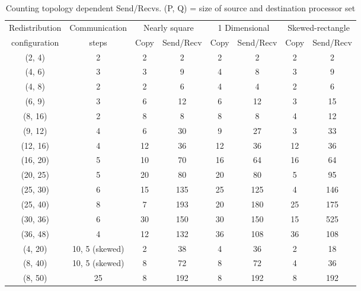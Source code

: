 \documentclass[letterpaper]{llncs}
\begin{document}
\begin{table}[ht]
\begin{center}
\caption{ Counting topology dependent Send/Recvs. (P, Q) = size of source and destination processor set}
\label{tab:topologycount}
\begin{tabular}{|c|c|c|c|c|c|c|c|}
\hline
Redistribution&Communication&\multicolumn{2}{|c|}{Nearly square}&\multicolumn{2}{|c|}{1 Dimensional}&\multicolumn{2}{|c|}{Skewed-rectangle}\\
configuration&steps&Copy&Send/Recv&Copy&Send/Recv&Copy&Send/Recv\\
\hline
(2, 4)&2&2&2&2&2&2&2\\
\hline
(4, 6)&3&3&9&4&8&3&9\\
\hline
(4, 8)&2&2&6&4&4&2&6\\
\hline
(6, 9)&3&6&12&6&12&3&15\\
\hline
(8, 16)&2&8&8&8&8&4&12\\
\hline
(9, 12)&4&6&30&9&27&3&33\\
\hline
(12, 16)&4&12&36&12&36&12&36\\
\hline
(16, 20)&5&10&70&16&64&16&64\\
\hline
(20, 25)&5&20&80&20&80&5&95\\
\hline
(25, 30)&6&15&135&25&125&4&146\\
\hline
(25, 40)&8&7&193&20&180&25&175\\
\hline
(30, 36)&6&30&150&30&150&15&525\\
\hline
(36, 48)&4&12&132&36&108&36&108\\
\hline
(4, 20)&10, 5 (skewed)&2&38&4&36&2&18\\
\hline
(8, 40)&10, 5 (skewed)&8&72&8&72&4&36\\
\hline
(8, 50)&25&8&192&8&192&8&192\\
\hline
\end{tabular}
\end{center}
\end{table}
\end{document}
